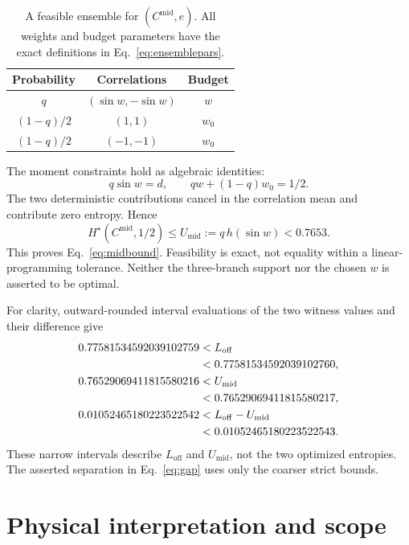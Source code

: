 \documentclass[aps,pra,reprint,amsmath,amssymb,longbibliography,nofootinbib]{revtex4-2}
\newcommand{\Hs}{H^{\star}}
\newcommand{\Cmid}{C^{\mathrm{mid}}}
\newcommand{\Loff}{L_{\mathrm{off}}}
\newcommand{\Umid}{U_{\mathrm{mid}}}
\begin{document}
\begin{table}[b]
 \caption{A feasible ensemble for $(\Cmid,e)$. All weights and budget
 parameters have the exact definitions in Eq.~\eqref{eq:ensemblepars}.}
 \label{tab:ensemble}
 \begin{ruledtabular}
 \begin{tabular}{ccc}
 Probability & Correlations & Budget\\
 \hline
 $q$ & $(\sin w,-\sin w)$ & $w$\\
 $(1-q)/2$ & $(1,1)$ & $w_0$\\
 $(1-q)/2$ & $(-1,-1)$ & $w_0$
 \end{tabular}
 \end{ruledtabular}
\end{table}

The moment constraints hold as algebraic identities:
\begin{equation}
 q\sin w=d,\qquad qw+(1-q)w_0=1/2.
\end{equation}
The two deterministic contributions cancel in the correlation mean and
contribute zero entropy. Hence
\begin{equation}
 \Hs(\Cmid,1/2)\leq\Umid:=q\,h(\sin w)<0.7653.
 \label{eq:U}
\end{equation}
This proves Eq.~\eqref{eq:midbound}. Feasibility is exact, not equality
within a linear-programming tolerance. Neither the three-branch support
nor the chosen $w$ is asserted to be optimal.

For clarity, outward-rounded interval evaluations of the two witness values
and their difference give
\begin{align}
 0.77581534592039102759&<\Loff\notag\\
 &<0.77581534592039102760,\notag\\
 0.76529069411815580216&<\Umid\notag\\
 &<0.76529069411815580217,\label{eq:scalarintervals}\\
 0.01052465180223522542&<\Loff-\Umid\notag\\
 &<0.01052465180223522543.\notag
\end{align}
These narrow intervals describe $\Loff$ and $\Umid$, not the two optimized
entropies. The asserted separation in Eq.~\eqref{eq:gap} uses only the
coarser strict bounds.

\section{Physical interpretation and scope}\label{sec:scope}
\end{document}
